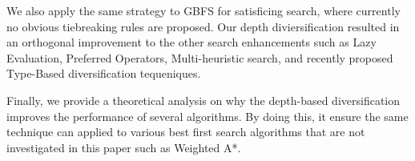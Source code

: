 We also apply the same strategy to GBFS for satisficing search, where
 currently no obvious tiebreaking rules are proposed. Our depth
 diviersification resulted in an orthogonal improvement to the other
 search enhancements such as Lazy Evaluation, Preferred Operators,
 Multi-heuristic search, and recently proposed Type-Based
 diversification tequeniques.

Finally, we provide a theoretical analysis on why the depth-based
diversification improves the performance of several algorithms. By doing
this, it ensure the same technique can applied to various best first
search algorithms that are not investigated in this paper such as
Weighted A*.
